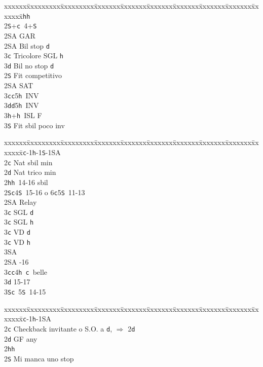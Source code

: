 \documentclass[a4paper,italian]{article}
\newcommand{\BS}{\small{\texttt{S}}}
\newcommand{\BC}{\small{\texttt{c}}}
\newcommand{\BD}{\small{\texttt{d}}}
\newcommand{\BH}{\small{\texttt{h}}}
\newenvironment{bidtable}
{\begin{tabbing}

    xxxxxx\=xxxxxxxxx\=xxxxxxxxx\=xxxxxxx\=xxxxxxx\=xxxxxxx\=xxxxxxx\=xxxxxxx\=xxxxxxx\=xxxxxxx\=\kill}
{\end{tabbing} }%
\begin{document}
\begin{multicols}{2}
\begin{bidtable}
        2\BH {}\BH \\
        2\BS {}+\BC\ 4+\BS \+\\
        2\small{SA} \> GAR\-\\
        2\small{SA} \> Bil stop \BD \\
        3\BC \> Tricolore SGL \BH \\
        3\BD \> Bil no stop \BD \-\\
        [2pt]2\BS \> Fit competitivo\\
        2\small{SA} \small{SA}T\\
        3\BC {}\BC 5\BH\ INV\\
        3\BD {}\BD 5\BH\ INV\\
        3\BH {}+\BH\ ISL F\\
        3\BS \> Fit sbil poco inv\-
    \end{bidtable}
    \vfill\null
    \columnbreak
    \begin{bidtable}
        1\BC-1\BH-1\BS-1\small{SA}\+\\
        2\BC \> Nat sbil min\\
        2\BD \> Nat trico min\\
        2\BH {}\BH\ 14-16 sbil\\
        2\BS {}\BC 4\BS\ 15-16 o 6\BC 5\BS\ 11-13\+\\
        2\small{SA} \> Relay\+\\
        3\BC {} SGL \BD\\
        3\BC {} SGL \BH\\
        3\BC {} VD \BD\\
        3\BC {} VD \BH\\
        3\small{SA} \-\-\\
        2\small{SA} -16\\
        3\BC {}\BC 4\BH\ \BC\ belle\\
        3\BD {} 15-17\\
        3\BS {}\BC\ 5\BS\ 14-15\-
    \end{bidtable}
    \bigbreak
    \begin{bidtable}
        1\BC-1\BH-1\small{SA}\+\\
        2\BC \> Checkback invitante o S.O. a \BD , $\Rightarrow$ 2\BD \\
        2\BD \> GF any\+\\
        2\BH {}\BH \\
        2\BS \> Mi manca uno stop\\

\end{bidtable}
\end{multicols}
\end{document}
